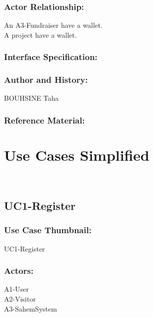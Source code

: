 \documentclass[11pt, openany]{report}
\begin{document}
\subsubsection{Actor Relationship:}
An A3-Fundraiser have a wallet.\\
A project have a wallet.
\subsubsection{Interface Specification:}
\subsubsection{Author and History:}
BOUHSINE Taha
\subsubsection{Reference Material:}

\clearpage

\section{Use Cases Simplified}
\

\subsection{UC1-Register}
\label{sUC1}
\subsubsection*{Use Case Thumbnail:}
UC1-Register
\subsubsection*{Actors:}
A1-User\\
A2-Visitor\\
A3-SahemSystem
\end{document}

